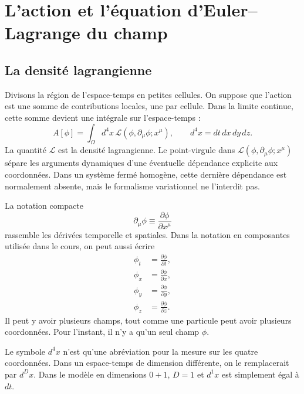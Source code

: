 \section{L’action et l’équation d’Euler--Lagrange du champ}

\subsection{La densité lagrangienne}

Divisons la région de l’espace-temps en petites cellules. On suppose que l’action est une somme de contributions locales, une par cellule. Dans la limite continue, cette somme devient une intégrale sur l’espace-temps :
\begin{equation}
A[\phi]
=
\int_{\Omega} d^4x\,
\mathcal{L}\!\left(
\phi,\partial_\mu\phi;x^\mu
\right),
\qquad
d^4x=dt\,dx\,dy\,dz.
\label{eq:sr4-field-action}
\end{equation}
La quantité \(\mathcal{L}\) est la densité lagrangienne. Le point-virgule dans \(\mathcal{L}(\phi,\partial_\mu\phi;x^\mu)\) sépare les arguments dynamiques d’une éventuelle dépendance explicite aux coordonnées. Dans un système fermé homogène, cette dernière dépendance est normalement absente, mais le formalisme variationnel ne l’interdit pas.

La notation compacte
\begin{equation}
\partial_\mu\phi
\equiv
\frac{\partial\phi}{\partial x^\mu}
\end{equation}
rassemble les dérivées temporelle et spatiales. Dans la notation en composantes utilisée dans le cours, on peut aussi écrire
\begin{equation}
\begin{aligned}
\phi_t&=\frac{\partial\phi}{\partial t},\\
\phi_x&=\frac{\partial\phi}{\partial x},\\
\phi_y&=\frac{\partial\phi}{\partial y},\\
\phi_z&=\frac{\partial\phi}{\partial z}.
\end{aligned}
\label{eq:sr4-component-derivatives}
\end{equation}
Il peut y avoir plusieurs champs, tout comme une particule peut avoir plusieurs coordonnées. Pour l’instant, il n’y a qu’un seul champ \(\phi\).

Le symbole \(d^4x\) n’est qu’une abréviation pour la mesure sur les quatre coordonnées. Dans un espace-temps de dimension différente, on le remplacerait par \(d^Dx\). Dans le modèle en dimensions \(0+1\), \(D=1\) et \(d^1x\) est simplement égal à \(dt\).

